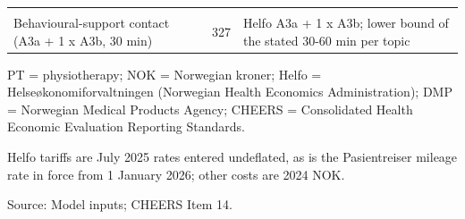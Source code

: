 \begin{table}
{\begin{threeparttable}
\begin{tabular}[t]{lrl}
\cellcolor[HTML]{F7F9FC}{\textcolor[HTML]{2D3748}{Initial assessment Helfo A1d (one-time)}} & \cellcolor[HTML]{F7F9FC}{\textcolor[HTML]{2D3748}{516}} & \cellcolor[HTML]{F7F9FC}{\textcolor[HTML]{2D3748}{Helfo tariff (see note)}}\\
\textcolor[HTML]{2D3748}{Behavioural-support contact (A3a + 1 x A3b, 30 min)} & \textcolor[HTML]{2D3748}{327} & \textcolor[HTML]{2D3748}{Helfo A3a + 1 x A3b; lower bound of the stated 30-60 min per topic}\\
\bottomrule
\end{tabular}
\begin{tablenotes}
\item PT = physiotherapy; NOK = Norwegian kroner; Helfo = Helseøkonomiforvaltningen (Norwegian Health Economics Administration); DMP = Norwegian Medical Products Agency; CHEERS = Consolidated Health Economic Evaluation Reporting Standards.
\item Helfo tariffs are July 2025 rates entered undeflated, as is the Pasientreiser mileage rate in force from 1 January 2026; other costs are 2024 NOK.
\item Source: Model inputs; CHEERS Item 14.
\end{tablenotes}
\end{threeparttable}
}
\end{table}
